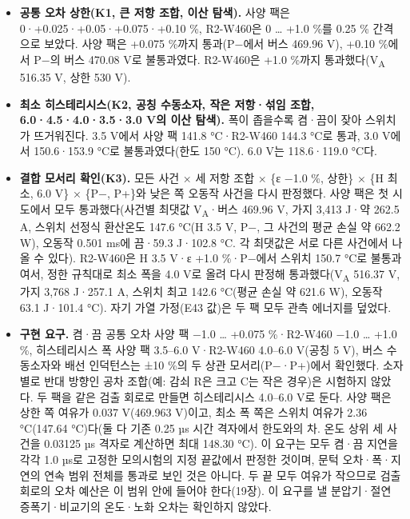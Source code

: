 \begin{itemize}
\item \textbf{공통 오차 상한(K1, 큰 저항 조합, 이산 탐색).} 사양 팩은 0·+0.025·+0.05·+0.075·+0.10 \%, R2-W460은 0 … +1.0 \%를 0.25 \% 간격으로 보았다. 사양 팩은 +0.075 \%까지 통과(P−에서 버스 469.96 V), +0.10 \%에서 P−의 버스 470.08 V로 불통과였다. R2-W460은 +1.0 \%까지 통과했다(V\textsubscript{A} 516.35 V, 상한 530 V).
\item \textbf{최소 히스테리시스(K2, 공칭 수동소자, 작은 저항·섞임 조합, 6.0·4.5·4.0·3.5·3.0 V의 이산 탐색).} 폭이 좁을수록 켬·끔이 잦아 스위치가 뜨거워진다. 3.5 V에서 사양 팩 141.8 °C·R2-W460 144.3 °C로 통과, 3.0 V에서 150.6·153.9 °C로 불통과였다(한도 150 °C). 6.0 V는 118.6·119.0 °C다.
\item \textbf{결합 모서리 확인(K3).} 모든 사건 × 세 저항 조합 × \{ε −1.0 \%, 상한\} × \{H 최소, 6.0 V\} × \{P−, P+\}와 낮은 쪽 오동작 사건을 다시 판정했다. 사양 팩은 첫 시도에서 모두 통과했다(사건별 최댓값 V\textsubscript{A}·버스 469.96 V, 가지 3,413 J·약 262.5 A, 스위치 선정식 환산온도 147.6 °C(H 3.5 V, P−, 그 사건의 평균 손실 약 662.2 W), 오동작 0.501 ms에 끔·59.3 J·102.8 °C. 각 최댓값은 서로 다른 사건에서 나올 수 있다). R2-W460은 H 3.5 V·ε +1.0 \%·P−에서 스위치 150.7 °C로 불통과여서, 정한 규칙대로 최소 폭을 4.0 V로 올려 다시 판정해 통과했다(V\textsubscript{A} 516.37 V, 가지 3,768 J·257.1 A, 스위치 최고 142.6 °C(평균 손실 약 621.6 W), 오동작 63.1 J·101.4 °C). 자기 가열 가정(E43 값)은 두 팩 모두 관측 에너지를 덮었다.
\item \textbf{구현 요구.} 켬·끔 공통 오차 사양 팩 −1.0 … +0.075 \%·R2-W460 −1.0 … +1.0 \%, 히스테리시스 폭 사양 팩 3.5–6.0 V·R2-W460 4.0–6.0 V(공칭 5 V), 버스 수동소자와 배선 인덕턴스는 ±10 \%의 두 상관 모서리(P−·P+)에서 확인했다. 소자별로 반대 방향인 공차 조합(예: 감쇠 R은 크고 C는 작은 경우)은 시험하지 않았다. 두 팩을 같은 검출 회로로 만들면 히스테리시스 4.0–6.0 V로 둔다. 사양 팩은 상한 쪽 여유가 0.037 V(469.963 V)이고, 최소 폭 쪽은 스위치 여유가 2.36 °C(147.64 °C)다(둘 다 기존 0.25 µs 시간 격자에서 한도와의 차. 온도 상위 세 사건을 0.03125 µs 격자로 계산하면 최대 148.30 °C). 이 요구는 모두 켬·끔 지연을 각각 1.0 µs로 고정한 모의시험의 지정 끝값에서 판정한 것이며, 문턱 오차·폭·지연의 연속 범위 전체를 통과로 보인 것은 아니다. 두 끝 모두 여유가 작으므로 검출 회로의 오차 예산은 이 범위 안에 들어야 한다(19장). 이 요구를 낼 분압기·절연 증폭기·비교기의 온도·노화 오차는 확인하지 않았다.
\end{itemize}

